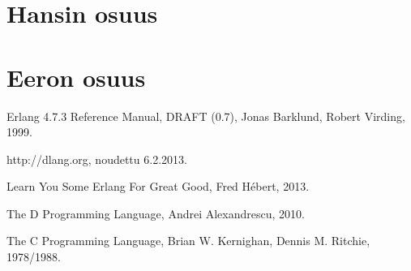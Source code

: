 \documentclass[11pt,oneside,a4paper]{article}
\begin{document}
\section{Hansin osuus}

\section{Eeron osuus}






\begin{thebibliography}{99}

 Erlang 4.7.3 Reference Manual, DRAFT (0.7), Jonas
Barklund, Robert Virding, 1999. 

 http://dlang.org, noudettu 6.2.2013.

 Learn You Some Erlang For Great Good, Fred Hébert, 2013.

 The D Programming Language, Andrei Alexandrescu, 2010.

 The C Programming Language, Brian W. Kernighan, Dennis M. Ritchie, 1978/1988.

\end{thebibliography}
\end{document}
